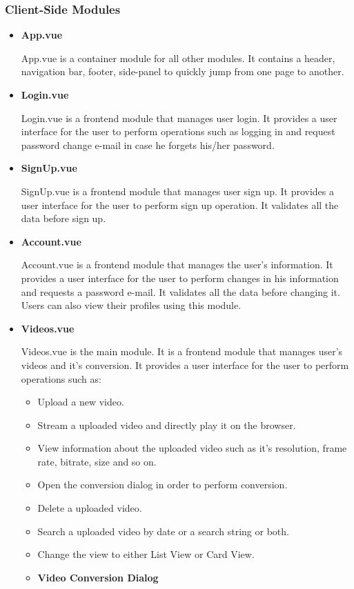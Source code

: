 		\subsubsection{Client-Side Modules}
				\vs
		\begin{itemize}
			
			\item
			\large\textbf{App.vue}
			
			\hspace{2cm}
			App.vue is a container module for all other modules. It contains a header, navigation bar, footer, side-panel to quickly jump from one page to another.
			\vs
			\item
			\large\textbf{Login.vue}
			
			\hspace{2cm}
			Login.vue is a frontend module that manages user login. It provides a user interface for the user to perform operations such as logging in and request password change e-mail in case he forgets his/her password.
			\vs
			\item
			\large\textbf{SignUp.vue}
			
			\hspace{2cm}
			SignUp.vue is a frontend module that manages user sign up. It provides a user interface for the user to perform sign up operation. It validates all the data before sign up.
			\vs
			\item
			\large\textbf{Account.vue}
			
			\hspace{2cm}
			Account.vue is a frontend module that manages the user's information. It provides a user interface for the user to perform changes in his information and requests a password e-mail. It validates all the data before changing it. Users can also view their profiles using this module.
			\vs
			\item
			\large\textbf{Videos.vue}
			
			\hspace{2cm}
			Videos.vue is the main module. It is a frontend module that manages user's videos and it's conversion. It provides a user interface for the user to perform operations such as:
			\begin{itemize}
				\item Upload a new video.
				\item Stream a uploaded video and directly play it on the browser.
				\item View information about the uploaded video such as it's resolution, frame rate, bitrate, size and so on.
				\item Open the conversion dialog in order to perform conversion.
				\item Delete a uploaded video.
				\item Search a uploaded video by date or a search string or both.
				\item Change the view to either List View or Card View.
				\item
				\textbf{Video Conversion Dialog}
				

\end{itemize}
\end{itemize}
